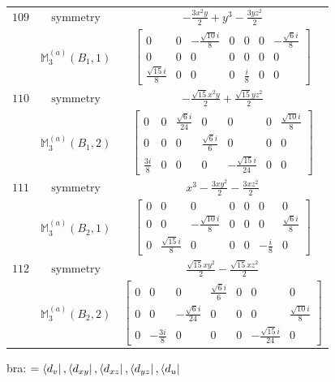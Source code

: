 \documentclass[fleqn,8pt,landscape]{jsarticle}
\begin{document}
\begin{longtable}{ccc}
$ 109 $ & $ \text{symmetry} $ & $ - \frac{3 x^{2} y}{2} + y^{3} - \frac{3 y z^{2}}{2} $ \\
$  $ & $ \mathbb{M}_{3}^{(a)}(B_{1},1) $ & $ \begin{bmatrix} 0 & 0 & - \frac{\sqrt{10} i}{8} & 0 & 0 & 0 & - \frac{\sqrt{6} i}{8} \\ 0 & 0 & 0 & 0 & 0 & 0 & 0 \\ \frac{\sqrt{15} i}{8} & 0 & 0 & 0 & \frac{i}{8} & 0 & 0 \end{bmatrix} $ \\ \hline
$ 110 $ & $ \text{symmetry} $ & $ - \frac{\sqrt{15} x^{2} y}{2} + \frac{\sqrt{15} y z^{2}}{2} $ \\
$  $ & $ \mathbb{M}_{3}^{(a)}(B_{1},2) $ & $ \begin{bmatrix} 0 & 0 & \frac{\sqrt{6} i}{24} & 0 & 0 & 0 & \frac{\sqrt{10} i}{8} \\ 0 & 0 & 0 & \frac{\sqrt{6} i}{6} & 0 & 0 & 0 \\ \frac{3 i}{8} & 0 & 0 & 0 & - \frac{\sqrt{15} i}{24} & 0 & 0 \end{bmatrix} $ \\ \hline
$ 111 $ & $ \text{symmetry} $ & $ x^{3} - \frac{3 x y^{2}}{2} - \frac{3 x z^{2}}{2} $ \\
$  $ & $ \mathbb{M}_{3}^{(a)}(B_{2},1) $ & $ \begin{bmatrix} 0 & 0 & 0 & 0 & 0 & 0 & 0 \\ 0 & 0 & - \frac{\sqrt{10} i}{8} & 0 & 0 & 0 & \frac{\sqrt{6} i}{8} \\ 0 & \frac{\sqrt{15} i}{8} & 0 & 0 & 0 & - \frac{i}{8} & 0 \end{bmatrix} $ \\ \hline
$ 112 $ & $ \text{symmetry} $ & $ \frac{\sqrt{15} x y^{2}}{2} - \frac{\sqrt{15} x z^{2}}{2} $ \\
$  $ & $ \mathbb{M}_{3}^{(a)}(B_{2},2) $ & $ \begin{bmatrix} 0 & 0 & 0 & \frac{\sqrt{6} i}{6} & 0 & 0 & 0 \\ 0 & 0 & - \frac{\sqrt{6} i}{24} & 0 & 0 & 0 & \frac{\sqrt{10} i}{8} \\ 0 & - \frac{3 i}{8} & 0 & 0 & 0 & - \frac{\sqrt{15} i}{24} & 0 \end{bmatrix} $ \\ \hline
\end{longtable}
bra: $=\bra{d_{v}}, \bra{d_{xy}}, \bra{d_{xz}}, \bra{d_{yz}}, \bra{d_{u}}$
\end{document}
